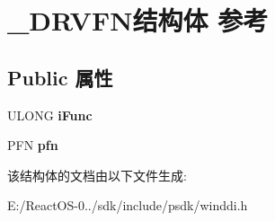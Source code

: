 \hypertarget{struct___d_r_v_f_n}{}\section{\+\_\+\+D\+R\+V\+F\+N结构体 参考}
\label{struct___d_r_v_f_n}
\subsection*{Public 属性}
\begin{DoxyCompactItemize}
\item 
\mbox{\label{struct___d_r_v_f_n_a1ff6e0370b3c0d8432132114d9055025}} 
U\+L\+O\+NG {\bfseries i\+Func}
\item 
\mbox{\label{struct___d_r_v_f_n_a1407f815fc31bdf8962eb91c99a4de63}} 
P\+FN {\bfseries pfn}
\end{DoxyCompactItemize}


该结构体的文档由以下文件生成\+:\begin{DoxyCompactItemize}
\item 
E\+:/\+React\+O\+S-\/0../sdk/include/psdk/winddi.\+h\end{DoxyCompactItemize}

